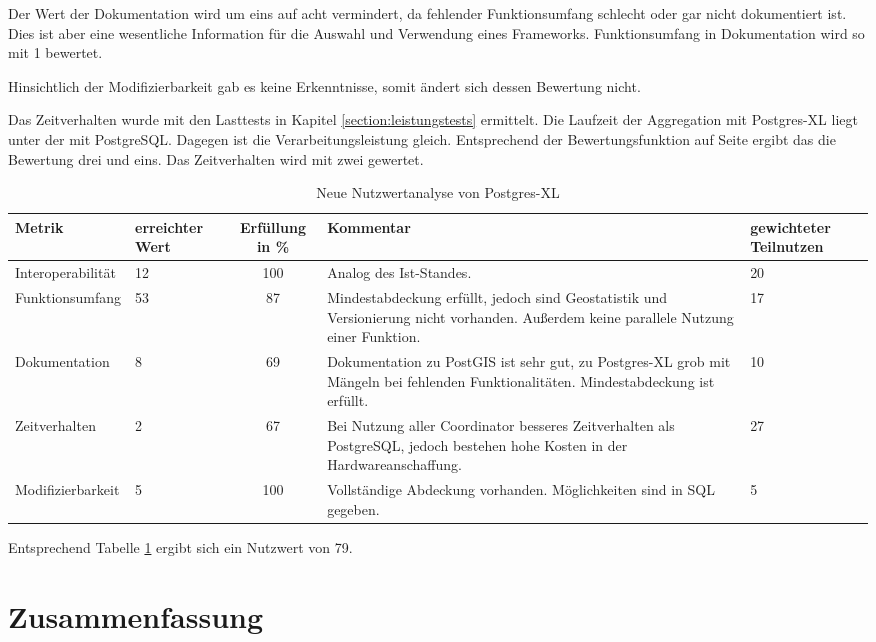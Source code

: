 Der Wert der Dokumentation wird um eins auf acht vermindert, da fehlender Funktionsumfang schlecht oder gar nicht dokumentiert ist.
Dies ist aber eine wesentliche Information für die Auswahl und Verwendung eines Frameworks.
Funktionsumfang in Dokumentation wird so mit 1 bewertet.

Hinsichtlich der Modifizierbarkeit gab es keine Erkenntnisse, somit ändert sich dessen Bewertung nicht.

Das Zeitverhalten wurde mit den Lasttests in Kapitel \ref{section:leistungstests} ermittelt.
Die Laufzeit der Aggregation mit Postgres-XL liegt unter der mit PostgreSQL.
Dagegen ist die Verarbeitungsleistung gleich.
Entsprechend der Bewertungsfunktion auf Seite \pageref{bf:zeitverhalten} ergibt das die Bewertung drei und eins.
Das Zeitverhalten wird mit zwei gewertet.

\begin{table}[h!]
\centering
\small
\begin{tabular}{l|p{1.8cm}|c|p{3.1cm}|p{1.8cm}}
\textbf{Metrik} & \textbf{erreichter Wert} & \textbf{Erfüllung in \%} & \textbf{Kommentar} & \textbf{gewichteter Teilnutzen} \\ \hline
Interoperabilität & 12 & 100 & Analog des Ist-Standes. & 20 \\ \hline
Funktionsumfang & 53 & 87 & Mindestabdeckung erfüllt, jedoch sind Geostatistik und Versionierung nicht vorhanden. Außerdem keine parallele Nutzung einer Funktion. & 17 \\ \hline
Dokumentation & 8 & 69 & Dokumentation zu PostGIS ist sehr gut, zu Postgres-XL grob mit Mängeln bei fehlenden Funktionalitäten. Mindestabdeckung ist erfüllt. & 10 \\ \hline
Zeitverhalten & 2 & 67 & Bei Nutzung aller Coordinator besseres Zeitverhalten als PostgreSQL, jedoch bestehen hohe Kosten in der Hardwareanschaffung. & 27 \\ \hline
Modifizierbarkeit & 5 & 100 & Vollständige Abdeckung vorhanden. Möglichkeiten sind in SQL gegeben. & 5 \\
\end{tabular}
\caption{Neue Nutzwertanalyse von Postgres-XL}
\label{table:nutzwertanalyse2-postgresxl}
\end{table}
Entsprechend Tabelle \ref{table:nutzwertanalyse2-postgresxl} ergibt sich ein Nutzwert von 79.

\section{Zusammenfassung}


